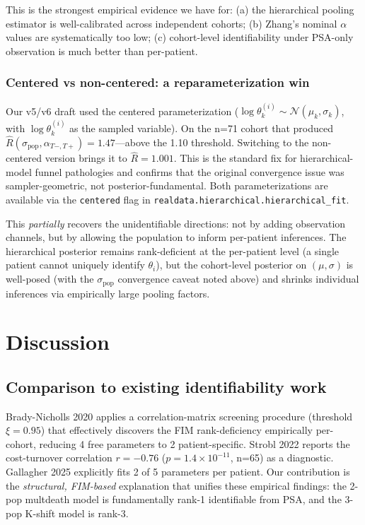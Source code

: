 \documentclass[11pt]{article}
\newcommand{\Tplus}{T{+}}
\newcommand{\Tminus}{T{-}}
\newcommand{\rhat}{\hat{R}}
\begin{document}
This is the strongest empirical evidence we have for: (a) the hierarchical
pooling estimator is well-calibrated across independent cohorts; (b) Zhang's
nominal $\alpha$ values are systematically too low; (c) cohort-level
identifiability under PSA-only observation is much better than per-patient.

\subsubsection{Centered vs non-centered: a reparameterization win}\label{sec:hier_param}

Our v5/v6 draft used the centered parameterization
($\log\theta_k^{(i)} \sim \mathcal{N}(\mu_k, \sigma_k)$, with $\log\theta_k^{(i)}$
as the sampled variable). On the n=71 cohort that produced
$\rhat(\sigma_\text{pop}, \alpha_{\Tminus,\Tplus}) = 1.47$---above the 1.10
threshold. Switching to the non-centered version brings it to $\rhat = 1.001$.
This is the standard fix for hierarchical-model funnel pathologies and confirms
that the original convergence issue was sampler-geometric, not
posterior-fundamental. Both parameterizations are available via the
\texttt{centered} flag in \texttt{realdata.hierarchical.hierarchical\_fit}.

This \emph{partially} recovers the unidentifiable directions: not by adding
observation channels, but by allowing the population to inform per-patient
inferences. The hierarchical posterior remains rank-deficient at the per-patient
level (a single patient cannot uniquely identify $\theta_i$), but the
cohort-level posterior on $(\mu, \sigma)$ is well-posed (with the
$\sigma_\text{pop}$ convergence caveat noted above) and shrinks individual
inferences via empirically large pooling factors.

\section{Discussion}\label{sec:disc}

\subsection{Comparison to existing identifiability work}

Brady-Nicholls 2020 \cite{BradyNicholls2020} applies a correlation-matrix screening
procedure (threshold $\xi = 0.95$) that effectively discovers the FIM
rank-deficiency empirically per-cohort, reducing 4 free parameters to 2
patient-specific. Strobl 2022 \cite{Strobl2022} reports the cost-turnover
correlation $r = -0.76$ ($p = 1.4 \times 10^{-11}$, n=65) as a diagnostic.
Gallagher 2025 \cite{Gallagher2025} explicitly fits 2 of 5 parameters per patient.
Our contribution is the \emph{structural, FIM-based} explanation that unifies
these empirical findings: the 2-pop multdeath model is fundamentally rank-1
identifiable from PSA, and the 3-pop K-shift model is rank-3.
\end{document}
